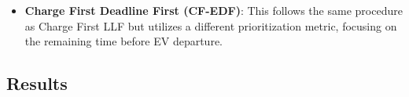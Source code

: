 \begin{itemize}[leftmargin=*]



% 

\item {\bf Charge First Deadline First (CF-EDF)}: This follows the same procedure as Charge First LLF but utilizes a different prioritization metric, focusing on the remaining time before EV departure. 





    \color{black}
    \color{black}
\end{itemize}

\subsection{Results}
\label{ssec:results}
% 


